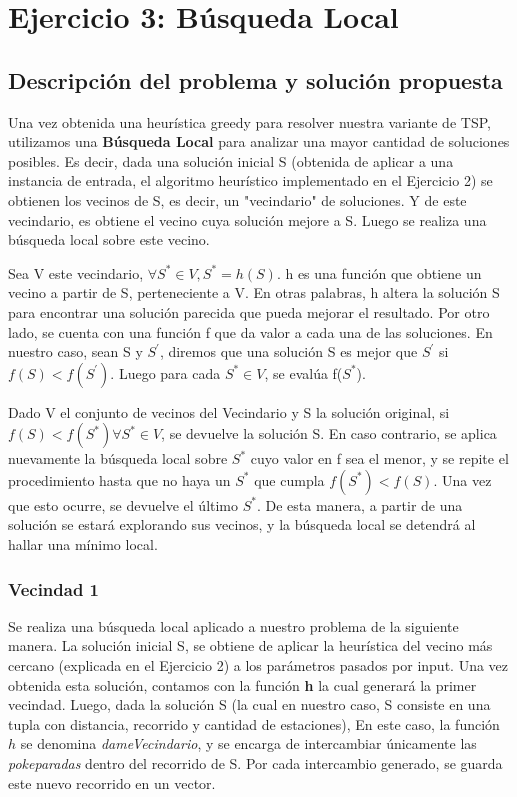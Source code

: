 \section{Ejercicio 3: Búsqueda Local}
    \subsection{Descripción del problema y solución propuesta}

    \par Una vez obtenida una heurística greedy para resolver nuestra variante de TSP, utilizamos una \textbf{Búsqueda Local} para analizar una mayor cantidad de soluciones posibles. Es decir, dada una solución inicial S (obtenida de aplicar a una instancia de entrada, el algoritmo heurístico implementado en el Ejercicio 2) se obtienen los vecinos de S, es decir, un "vecindario" de soluciones. Y de este vecindario, es obtiene el vecino cuya solución mejore a S. Luego se realiza una búsqueda local sobre este vecino. 
    \par Sea V este vecindario, $\forall S^{*}\in V, S^{*} = h(S)$. h es una función que obtiene un vecino a partir de S, perteneciente a V. En otras palabras, h altera la solución S para encontrar una solución parecida que pueda mejorar el resultado. Por otro lado, se cuenta con una función f que da valor a cada una de las soluciones. En nuestro caso, sean S y $S^{'}$, diremos que una solución S es mejor que $S^{'}$ si $f(S) < f(S^{'})$. Luego para cada $S^{*}\in V$, se evalúa f($S^{*}$). 
    \par Dado V el conjunto de vecinos del Vecindario y S la solución original, si $f(S) < f(S^{*}) \forall S^{*}\in V$, se devuelve la solución S. En caso contrario, se aplica nuevamente la búsqueda local sobre $S^{*}$ cuyo valor en f sea el menor, y se repite el procedimiento hasta que no haya un $S^{*}$ que cumpla $f(S^{*}) < f(S)$. Una vez que esto ocurre, se devuelve el último $S^{*}$. De esta manera, a partir de una solución se estará explorando sus vecinos, y la búsqueda local se detendrá al hallar una mínimo local.

    \subsubsection{Vecindad 1}

    \par Se realiza una búsqueda local aplicado a nuestro problema de la siguiente manera. La solución inicial S, se obtiene de aplicar la heurística del vecino más cercano (explicada en el Ejercicio 2) a los parámetros pasados por input. Una vez obtenida esta solución, contamos con la función \textbf{h} la cual generará la primer vecindad. Luego, dada la solución S (la cual en nuestro caso, S consiste en una tupla con distancia, recorrido y cantidad de estaciones), 
    En este caso, la función $h$ se denomina \emph{dameVecindario}, y se encarga de intercambiar únicamente las \emph{pokeparadas} dentro del recorrido de S. Por cada intercambio generado, se guarda este nuevo recorrido en un vector.

